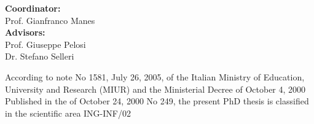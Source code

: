 \vspace{30pt}
\noindent \textbf{Coordinator:}\\[10pt]
\hspace*{20pt}	Prof. Gianfranco Manes\\[15pt]
\noindent \textbf{Advisors:}\\[10pt]
\hspace*{20pt}	Prof. Giuseppe Pelosi\\[10pt]
\hspace*{20pt}	Dr. Stefano Selleri



\newpage
\thispagestyle{empty}
\hfill

\vfill
{
\footnotesize{
\noindent According to note No 1581, July 26, 2005, of the Italian Ministry of Education, 
University and Research (MIUR) and the Ministerial Decree of October 4, 2000 
Published in the  of October 24, 2000 No 249,
the present PhD thesis is classified in the scientific area ING-INF/02
}
}
\mbox{}
\newpage



